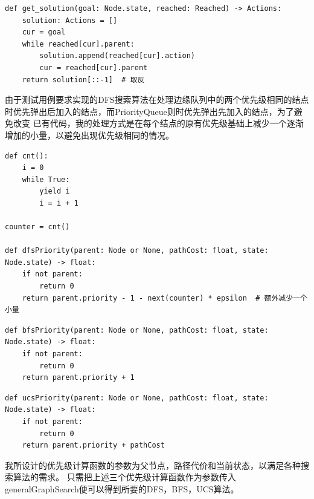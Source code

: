 \begin{lstlisting}[emph={[3]goal,problem,getPriority,reached},emphstyle={[3]\color{vscode_parametercolor}},
    emph={[4]SearchProblem,Callable,Node,Actions,Reached},emphstyle={[4]\color{vscode_classcolor}}
    ]
def get_solution(goal: Node.state, reached: Reached) -> Actions:
    solution: Actions = []
    cur = goal
    while reached[cur].parent:
        solution.append(reached[cur].action)
        cur = reached[cur].parent
    return solution[::-1]  # 取反
\end{lstlisting}

由于测试用例要求实现的DFS搜索算法在处理边缘队列中的两个优先级相同的结点时优先弹出后加入的结点，而PriorityQueue则时优先弹出先加入的结点，为了避免改变
已有代码，我的处理方式是在每个结点的原有优先级基础上减少一个逐渐增加的小量，以避免出现优先级相同的情况。

\begin{lstlisting}[emph={[3]parent},emphstyle={[3]\color{vscode_parametercolor}},emph={[4]SearchProblem,Callable,Node,Actions,Reached},emphstyle={[4]\color{vscode_classcolor}}]
def cnt():
    i = 0
    while True:
        yield i
        i = i + 1

counter = cnt()

def dfsPriority(parent: Node or None, pathCost: float, state: Node.state) -> float:
    if not parent:
        return 0
    return parent.priority - 1 - next(counter) * epsilon  # 额外减少一个小量
\end{lstlisting}

\begin{lstlisting}[emph={[3]parent,pathCost},emphstyle={[3]\color{vscode_parametercolor}},emph={[4]SearchProblem,Callable,Node,Actions,Reached},emphstyle={[4]\color{vscode_classcolor}}]
def bfsPriority(parent: Node or None, pathCost: float, state: Node.state) -> float:
    if not parent:
        return 0
    return parent.priority + 1
\end{lstlisting}

\begin{lstlisting}[emph={[3]parent,pathCost},emphstyle={[3]\color{vscode_parametercolor}},emph={[4]SearchProblem,Callable,Node,Actions,Reached},emphstyle={[4]\color{vscode_classcolor}}]
def ucsPriority(parent: Node or None, pathCost: float, state: Node.state) -> float:
    if not parent:
        return 0
    return parent.priority + pathCost
\end{lstlisting}

我所设计的优先级计算函数的参数为父节点，路径代价和当前状态，以满足各种搜索算法的需求。
只需把上述三个优先级计算函数作为参数传入generalGraphSearch便可以得到所要的DFS，BFS，UCS算法。

